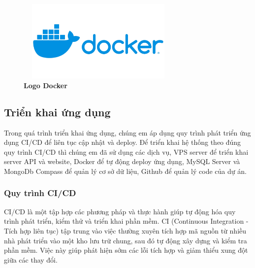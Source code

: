 \begin{figure}[H]
	\centering
	\includegraphics[width=8cm,height=4cm]{Images/Technology/docker.jpg}
	\caption[Logo Docker]{\bfseries \fontsize{12pt}{0pt}
		\selectfont Logo Docker}
	\label{docker} %
\end{figure}


\subsection{Triển khai ứng dụng}
Trong quá trình triển khai ứng dụng, chúng em áp dụng quy trình phát triển ứng dụng CI/CD để liên tục cập nhật và deploy. Để triển khai hệ thống theo đúng quy trình CI/CD thì chúng em đã sử dụng các dịch vụ, VPS server để triển khai server API và website, Docker để tự động deploy ứng dụng, MySQL Server và MongoDb Compass để quản lý cơ sở dữ liệu, Github để quản lý code của dự án.

\subsubsection{Quy trình CI/CD}
CI/CD là một tập hợp các phương pháp và thực hành giúp tự động hóa quy trình phát triển, kiểm thử và triển khai phần mềm. CI (Continuous Integration - Tích hợp liên tục) tập trung vào việc thường xuyên tích hợp mã nguồn từ nhiều nhà phát triển vào một kho lưu trữ chung, sau đó tự động xây dựng và kiểm tra phần mềm. Việc này giúp phát hiện sớm các lỗi tích hợp và giảm thiểu xung đột giữa các thay đổi.

